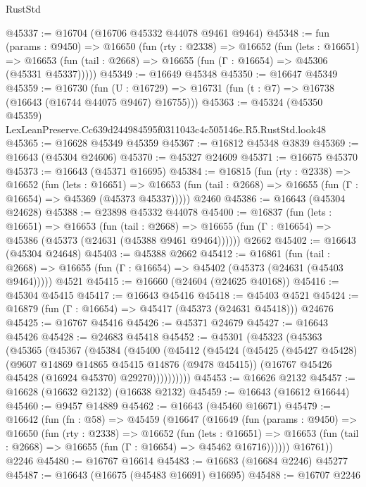 \begin{lexlean}{RustStd}
\begin{coremodule}
@45337 := @16704 (@16706 @45332 @44078 @9461 @9464)
@45348 := fun (params : @9450) =>
  @16650
    (fun (rty : @2338) =>
    @16652
      (fun (lets : @16651) =>
      @16653 (fun (tail : @2668) => @16655 (fun (Γ : @16654) => @45306 (@45331 @45337)))))
@45349 := @16649 @45348
@45350 := @16647 @45349
@45359 := @16730
    (fun (U : @16729) => @16731 (fun (t : @7) => @16738 (@16643 (@16744 @44075 @9467) @16755)))
@45363 := @45324 (@45350 @45359) LexLeanPreserve.Cc639d244984595f0311043c4c505146e.R5.RustStd.look48
@45365 := @16628 @45349 @45359
@45367 := @16812 @45348 @3839
@45369 := @16643 (@45304 @24606)
@45370 := @45327 @24609
@45371 := @16675 @45370
@45373 := @16643 (@45371 @16695)
@45384 := @16815
    (fun (rty : @2338) =>
    @16652
      (fun (lets : @16651) =>
      @16653 (fun (tail : @2668) => @16655 (fun (Γ : @16654) => @45369 (@45373 @45337)))))
    @2460
@45386 := @16643 (@45304 @24628)
@45388 := @23898 @45332 @44078
@45400 := @16837
    (fun (lets : @16651) =>
    @16653
      (fun (tail : @2668) =>
      @16655 (fun (Γ : @16654) => @45386 (@45373 (@24631 (@45388 @9461 @9464))))))
    @2662
@45402 := @16643 (@45304 @24648)
@45403 := @45388 @2662
@45412 := @16861
    (fun (tail : @2668) => @16655 (fun (Γ : @16654) => @45402 (@45373 (@24631 (@45403 @9464)))))
    @4521
@45415 := @16660 (@24604 (@24625 @40168))
@45416 := @45304 @45415
@45417 := @16643 @45416
@45418 := @45403 @4521
@45424 := @16879 (fun (Γ : @16654) => @45417 (@45373 (@24631 @45418))) @24676
@45425 := @16767 @45416
@45426 := @45371 @24679
@45427 := @16643 @45426
@45428 := @24683 @45418
@45452 := @45301
    (@45323
      (@45363
        (@45365
          (@45367
            (@45384
              (@45400
                (@45412
                  (@45424
                    (@45425
                      (@45427 @45428)
                      (@9607 @14869 @14865 @45415 @14876 (@9478 @45415))
                      (@16767 @45426 @45428 (@16924 @45370) @29270))))))))))
@45453 := @16626 @2132
@45457 := @16628 (@16632 @2132) (@16638 @2132)
@45459 := @16643 (@16612 @16644)
@45460 := @9457 @14889
@45462 := @16643 (@45460 @16671)
@45479 := @16642
    (fun (fn : @58) =>
    @45459
      (@16647
        (@16649
          (fun (params : @9450) =>
          @16650
            (fun (rty : @2338) =>
            @16652
              (fun (lets : @16651) =>
              @16653 (fun (tail : @2668) => @16655 (fun (Γ : @16654) => @45462 @16716))))))
        @16761))
    @2246
@45480 := @16767 @16614
@45483 := @16683 (@16684 @2246) @45277
@45487 := @16643 (@16675 (@45483 @16691) @16695)
@45488 := @16707 @2246

\end{coremodule}
\end{lexlean}
